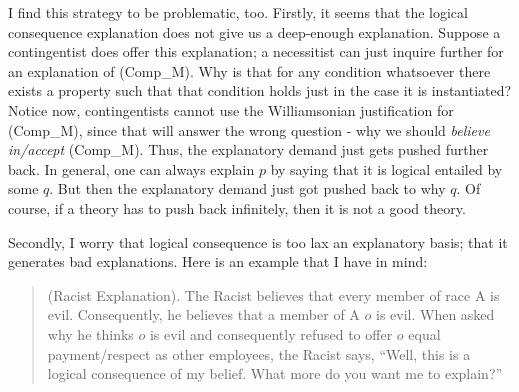 I find this strategy to be problematic, too. 
Firstly, it seems that the logical consequence explanation does not give us a deep-enough explanation. Suppose a contingentist does offer this explanation; a necessitist can just inquire further for an explanation of (Comp_M). Why is that for any condition whatsoever there exists a property such that that condition holds just in the case it is instantiated? Notice now, contingentists cannot use the Williamsonian justification for (Comp_M), since that will answer the wrong question - why we should \emph{believe in/accept} (Comp_M). Thus, the explanatory demand just gets pushed further back. In general, one can always explain $p$ by saying that it is logical entailed by some $q$. But then the explanatory demand just got pushed back to why $q$. Of course, if a theory has to push back infinitely, then it is not a good theory. 

Secondly, I worry that logical consequence is too lax an explanatory basis; that it generates bad explanations. 
Here is an example that I have in mind:

\begin{quote}
(Racist Explanation). \hspace{\labelsep} The Racist believes that every member of race A is evil. Consequently, he believes that a member of A $o$ is evil. When asked why he thinks $o$ is evil and consequently refused to offer $o$ equal payment/respect as other employees, the Racist says, ``Well, this is a logical consequence of my belief. What more do you want me to explain?''
\end{quote}

